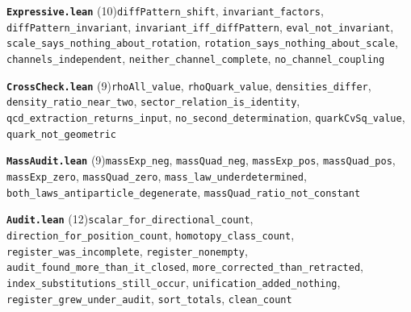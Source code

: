 \documentclass[11pt,a4paper]{article}
\theoremstyle{sudef}
\begin{document}
\noindent\textbf{\texttt{Expressive.lean}} (10)\quad \texttt{diffPattern\_\allowbreak shift}, \texttt{invariant\_\allowbreak factors}, \texttt{diffPattern\_\allowbreak invariant}, \texttt{invariant\_\allowbreak iff\_\allowbreak diffPattern}, \texttt{eval\_\allowbreak not\_\allowbreak invariant}, \texttt{scale\_\allowbreak says\_\allowbreak nothing\_\allowbreak about\_\allowbreak rotation}, \texttt{rotation\_\allowbreak says\_\allowbreak nothing\_\allowbreak about\_\allowbreak scale}, \texttt{channels\_\allowbreak independent}, \texttt{neither\_\allowbreak channel\_\allowbreak complete}, \texttt{no\_\allowbreak channel\_\allowbreak coupling}\par\smallskip
\noindent\textbf{\texttt{CrossCheck.lean}} (9)\quad \texttt{rhoAll\_\allowbreak value}, \texttt{rhoQuark\_\allowbreak value}, \texttt{densities\_\allowbreak differ}, \texttt{density\_\allowbreak ratio\_\allowbreak near\_\allowbreak two}, \texttt{sector\_\allowbreak relation\_\allowbreak is\_\allowbreak identity}, \texttt{qcd\_\allowbreak extraction\_\allowbreak returns\_\allowbreak input}, \texttt{no\_\allowbreak second\_\allowbreak determination}, \texttt{quarkCvSq\_\allowbreak value}, \texttt{quark\_\allowbreak not\_\allowbreak geometric}\par\smallskip
\noindent\textbf{\texttt{MassAudit.lean}} (9)\quad \texttt{massExp\_\allowbreak neg}, \texttt{massQuad\_\allowbreak neg}, \texttt{massExp\_\allowbreak pos}, \texttt{massQuad\_\allowbreak pos}, \texttt{massExp\_\allowbreak zero}, \texttt{massQuad\_\allowbreak zero}, \texttt{mass\_\allowbreak law\_\allowbreak underdetermined}, \texttt{both\_\allowbreak laws\_\allowbreak antiparticle\_\allowbreak degenerate}, \texttt{massQuad\_\allowbreak ratio\_\allowbreak not\_\allowbreak constant}\par\smallskip
\noindent\textbf{\texttt{Audit.lean}} (12)\quad \texttt{scalar\_\allowbreak for\_\allowbreak directional\_\allowbreak count}, \texttt{direction\_\allowbreak for\_\allowbreak position\_\allowbreak count}, \texttt{homotopy\_\allowbreak class\_\allowbreak count}, \texttt{register\_\allowbreak was\_\allowbreak incomplete}, \texttt{register\_\allowbreak nonempty}, \texttt{audit\_\allowbreak found\_\allowbreak more\_\allowbreak than\_\allowbreak it\_\allowbreak closed}, \texttt{more\_\allowbreak corrected\_\allowbreak than\_\allowbreak retracted}, \texttt{index\_\allowbreak substitutions\_\allowbreak still\_\allowbreak occur}, \texttt{unification\_\allowbreak added\_\allowbreak nothing}, \texttt{register\_\allowbreak grew\_\allowbreak under\_\allowbreak audit}, \texttt{sort\_\allowbreak totals}, \texttt{clean\_\allowbreak count}\par\smallskip

\normalsize
\end{document}
